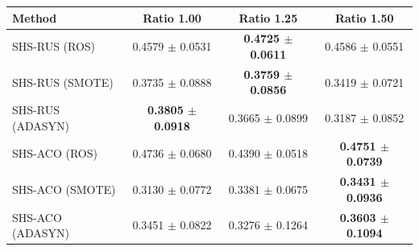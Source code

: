 \begin{tabular}{lccc}
\toprule
Method & Ratio 1.00 & Ratio 1.25 & Ratio 1.50 \\
\midrule
SHS-RUS (ROS) & 0.4579 $\pm$ 0.0531 & \textbf{0.4725 $\pm$ 0.0611} & 0.4586 $\pm$ 0.0551 \\
SHS-RUS (SMOTE) & 0.3735 $\pm$ 0.0888 & \textbf{0.3759 $\pm$ 0.0856} & 0.3419 $\pm$ 0.0721 \\
SHS-RUS (ADASYN) & \textbf{0.3805 $\pm$ 0.0918} & 0.3665 $\pm$ 0.0899 & 0.3187 $\pm$ 0.0852 \\
SHS-ACO (ROS) & 0.4736 $\pm$ 0.0680 & 0.4390 $\pm$ 0.0518 & \textbf{0.4751 $\pm$ 0.0739} \\
SHS-ACO (SMOTE) & 0.3130 $\pm$ 0.0772 & 0.3381 $\pm$ 0.0675 & \textbf{0.3431 $\pm$ 0.0936} \\
SHS-ACO (ADASYN) & 0.3451 $\pm$ 0.0822 & 0.3276 $\pm$ 0.1264 & \textbf{0.3603 $\pm$ 0.1094} \\
\bottomrule
\end{tabular}
